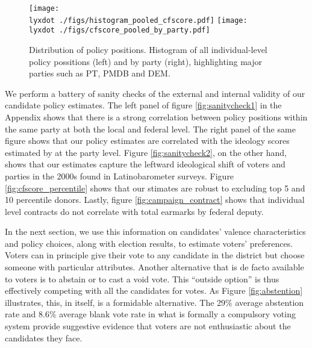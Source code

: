 \documentclass[12pt,english]{article}
\newcommand{\lyxdot}{.}
\numberwithin{equation}{section}
\theoremstyle{plain}
\theoremstyle{remark}
\theoremstyle{plain}
\begin{document}


\begin{figure}[h]
  \centering
  \texttt{[image: \\lyxdot ./figs/histogram\_pooled\_cfscore.pdf]}
  \texttt{[image: \\lyxdot ./figs/cfscore\_pooled\_by\_party.pdf]}
  \caption{Distribution of policy positions. Histogram of all individual-level policy possitions (left) and by party (right), highlighting major parties such as PT, PMDB and DEM.}
  \label{fig:cfscore_hist}
\end{figure} 

We perform a battery of sanity checks of the external and internal validity of our candidate policy estimates.  The left panel of figure \ref{fig:sanitycheck1} in the Appendix shows that there is a strong correlation between policy positions within the same party at both the local and federal level. The right panel of the same figure shows that our policy estimates are correlated with the ideology scores estimated by   at the party level. Figure \ref{fig:sanitycheck2}, on the other hand, shows that our estimates capture the leftward ideological shift of voters and parties in the 2000s found in Latinobarometer surveys. Figure \ref{fig:cfscore_percentile} shows that our stimates are robust to excluding top 5 and 10 percentile donors. Lastly, figure \ref{fig:campaign_contract} shows that individual level contracts do not correlate with total earmarks by federal deputy.%

In the next section, we use this information on candidates' valence characteristics and policy choices, along with election results, to estimate voters' preferences. Voters can in principle give their vote to any candidate in the district but choose someone with particular attributes. Another alternative that is de facto available to voters is to abstain or to cast a void vote. This ``outside option'' is thus effectively competing with all the candidates for votes. As Figure  \ref{fig:abstention} illustrates, this, in itself, is a formidable alternative. The 29\% average abstention rate and 8.6\% average blank vote rate in what is formally a compulsory voting system provide suggestive evidence that voters are not enthusiastic about the candidates they face.
\end{document}
